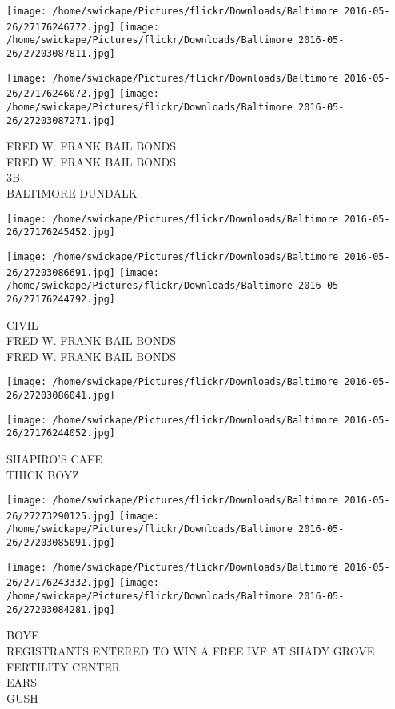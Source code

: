 \documentclass[10pt,letterpaper]{article}
\begin{document}
\texttt{[image: /home/swickape/Pictures/flickr/Downloads/Baltimore 2016-05-26/27176246772.jpg]}
\texttt{[image: /home/swickape/Pictures/flickr/Downloads/Baltimore 2016-05-26/27203087811.jpg]}

\texttt{[image: /home/swickape/Pictures/flickr/Downloads/Baltimore 2016-05-26/27176246072.jpg]}
\texttt{[image: /home/swickape/Pictures/flickr/Downloads/Baltimore 2016-05-26/27203087271.jpg]}

FRED W. FRANK BAIL BONDS\\
FRED W. FRANK BAIL BONDS\\
3B\\
BALTIMORE DUNDALK\\
\pagebreak

\texttt{[image: /home/swickape/Pictures/flickr/Downloads/Baltimore 2016-05-26/27176245452.jpg]}

\vspace{0.25in}
\texttt{[image: /home/swickape/Pictures/flickr/Downloads/Baltimore 2016-05-26/27203086691.jpg]}
\texttt{[image: /home/swickape/Pictures/flickr/Downloads/Baltimore 2016-05-26/27176244792.jpg]}

CIVIL\\
FRED W. FRANK BAIL BONDS\\
FRED W. FRANK BAIL BONDS\\
\pagebreak

\texttt{[image: /home/swickape/Pictures/flickr/Downloads/Baltimore 2016-05-26/27203086041.jpg]}

\vspace{0.25in}
\texttt{[image: /home/swickape/Pictures/flickr/Downloads/Baltimore 2016-05-26/27176244052.jpg]}

SHAPIRO'S CAFE\\
THICK BOYZ\\
\pagebreak

\texttt{[image: /home/swickape/Pictures/flickr/Downloads/Baltimore 2016-05-26/27273290125.jpg]}
\texttt{[image: /home/swickape/Pictures/flickr/Downloads/Baltimore 2016-05-26/27203085091.jpg]}

\texttt{[image: /home/swickape/Pictures/flickr/Downloads/Baltimore 2016-05-26/27176243332.jpg]}
\texttt{[image: /home/swickape/Pictures/flickr/Downloads/Baltimore 2016-05-26/27203084281.jpg]}

BOYE\\
REGISTRANTS ENTERED TO WIN A FREE IVF AT SHADY GROVE FERTILITY CENTER\\
EARS\\
GUSH\\
\pagebreak
\end{document}
